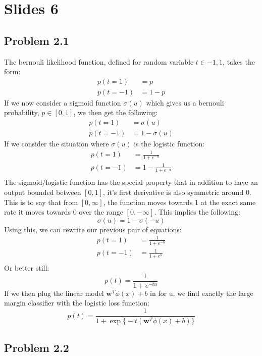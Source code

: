 \documentclass[a4paper,12pt]{article}
\begin{document}
\section*{Slides 6}

\subsection*{Problem 2.1}

The bernouli likelihood function, defined for random variable $t \in {-1,1}$, takes the form:
%
\begin{align*}
p(t = 1) &= p \\
p(t = -1) &= 1 - p
\end{align*}
%
If we now consider a sigmoid function $\sigma(u)$ which gives us a bernouli probability, $p \in [0,1]$, we then get the following:
%
\begin{align*}
p(t = 1) &= \sigma(u) \\
p(t = -1) &= 1 - \sigma(u)
\end{align*}
%
If we consider the situation where $\sigma(u)$ is the logistic function:
%
\begin{align*}
p(t = 1) &= \frac{1}{1 + e^{-u}} \\
p(t = -1) &= 1 - \frac{1}{1 + e^{-u}} \\
\end{align*}
%
The sigmoid/logistic function has the special property that in addition to have an output bounded between $[0,1]$, it's first derivative is also symmetric around 0. This is to say that from $[0, \infty]$, the function moves towards 1 at the exact same rate it moves towards 0 over the range $[0, -\infty]$. This implies the following:
%
$$
\sigma(u) = 1 - \sigma(-u)
$$
%
Using this, we can rewrite our previous pair of equations:
%
\begin{align*}
p(t = 1) &= \frac{1}{1 + e^{-u}} \\
p(t = -1) &= \frac{1}{1 + e^{u}} \\
\end{align*}
%
Or better still:
$$
p(t) = \frac{1}{1 + e^{-tu}}
$$
If we then plug the linear model $\bm{w}^T\phi(x) + b$ in for u, we find exactly the large margin classifier with the logistic loss function:
%
$$
p(t) = \frac{1}{1 + \exp \Big\{ -t(\bm{w}^T\phi(x) + b) \Big\} }
$$

\subsection*{Problem 2.2}
\end{document}
